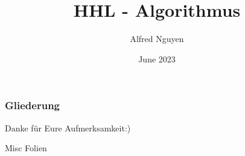 \documentclass{beamer}
\title{HHL - Algorithmus}
\author{Alfred Nguyen}
\institute{Fakultät der Informatik \\
Technische Universität München \\
  85758 Garching, Bavaria
}
\date{June 2023}
\begin{document}
  \frame{\titlepage}
  \begin{frame}
    \frametitle{Gliederung}
    \tableofcontents
  \end{frame}
  








\begin{frame}

  \begin{center}
    Danke für Eure Aufmerksamkeit:)
  \end{center}

\end{frame}

\begin{frame}
\end{frame}

\begin{frame}
\end{frame}

\begin{frame}
\end{frame}

\begin{frame}
Misc Folien

\end{frame}




%
\end{document}
